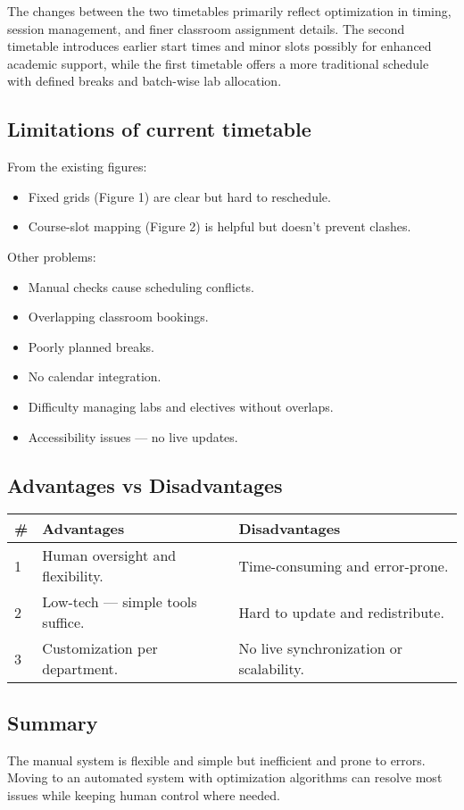 \documentclass[12pt]{article}
\begin{document}
The changes between the two timetables primarily reflect optimization in timing, session management, and finer classroom assignment details. The second timetable introduces earlier start times and minor slots possibly for enhanced academic support, while the first timetable offers a more traditional schedule with defined breaks and batch-wise lab allocation.

\subsection{Limitations of current timetable}
From the existing figures:
\begin{itemize}
    \item Fixed grids (Figure 1) are clear but hard to reschedule.
    \item Course-slot mapping (Figure 2) is helpful but doesn’t prevent clashes.
\end{itemize}

Other problems:
\begin{itemize}
    \item Manual checks cause scheduling conflicts.
    \item Overlapping classroom bookings.
    \item Poorly planned breaks.
    \item No calendar integration.
    \item Difficulty managing labs and electives without overlaps.
    \item Accessibility issues — no live updates.
\end{itemize}


\subsection*{Advantages vs Disadvantages}
\begin{longtable}{|p{0.5cm}|p{7cm}|p{7cm}|}
\hline
\# & Advantages & Disadvantages \\ \hline
1 & Human oversight and flexibility. & Time-consuming and error-prone. \\ \hline
2 & Low-tech — simple tools suffice. & Hard to update and redistribute. \\ \hline
3 & Customization per department. & No live synchronization or scalability. \\ \hline
\end{longtable}

\subsection*{Summary}
The manual system is flexible and simple but inefficient and prone to errors. Moving to an automated system with optimization algorithms can resolve most issues while keeping human control where needed.
\end{document}
